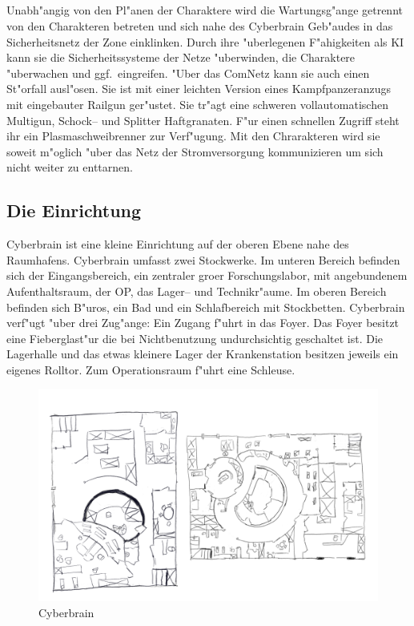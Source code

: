 \subsection{\xl} 
Unabh"angig von den Pl"anen der Charaktere wird \xl{} die Wartungsg"ange getrennt von den Charakteren betreten und sich nahe des Cyberbrain Geb"audes in das Sicherheitsnetz der Zone einklinken. Durch ihre "uberlegenen F"ahigkeiten als KI kann sie die Sicherheitssysteme der Netze "uberwinden, die Charaktere "uberwachen und ggf.~eingreifen. "Uber das ComNetz kann sie auch einen St"orfall ausl"osen. Sie ist mit einer leichten Version eines Kampfpanzeranzugs mit eingebauter Railgun ger"ustet. Sie tr"agt eine schweren vollautomatischen Multigun, Schock-- und Splitter Haftgranaten. F"ur einen schnellen Zugriff steht ihr ein Plasmaschwei\3brenner zur Verf"ugung. Mit den Chrarakteren wird sie soweit m"oglich "uber das Netz der Stromversorgung kommunizieren um sich nicht weiter zu enttarnen.

\subsection{Die Einrichtung} 
Cyberbrain ist eine kleine Einrichtung auf der oberen Ebene nahe des Raumhafens. Cyberbrain umfasst zwei Stockwerke. Im unteren Bereich befinden sich der Eingangsbereich, ein zentraler gro\3er Forschungslabor, mit angebundenem Aufenthaltsraum, der OP, das Lager-- und Technikr"aume. Im oberen Bereich befinden sich B"uros, ein Bad und ein Schlafbereich mit Stockbetten. Cyberbrain verf"ugt "uber drei Zug"ange: Ein Zugang f"uhrt in das Foyer. Das Foyer besitzt eine Fieberglast"ur die bei Nichtbenutzung undurchsichtig geschaltet ist. Die Lagerhalle und das etwas kleinere Lager der Krankenstation besitzen jeweils ein eigenes Rolltor. Zum Operationsraum f"uhrt eine Schleuse.

\begin{figure}[htbp]
	\centering
    \includegraphics[width=0.85\linewidth]{./images/cyberbrain.png}
    \newline{}Cyberbrain
	\label{fig:cyberbrain}
\end{figure}

